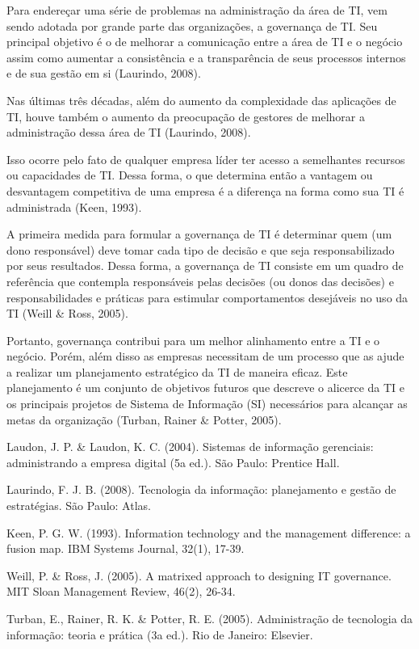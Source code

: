     Para endereçar uma série de problemas na administração da área de TI, vem sendo adotada por grande parte das organizações, a governança de TI. Seu principal objetivo é o de melhorar a comunicação entre a área de TI e o  negócio assim como aumentar a consistência e a transparência de seus processos internos e de sua gestão em si (Laurindo, 2008).

    Nas últimas três décadas, além do aumento da complexidade das aplicações de TI, houve também o aumento da preocupação de gestores de melhorar a administração dessa área de TI (Laurindo, 2008).

    Isso ocorre pelo fato de qualquer empresa líder ter acesso a semelhantes recursos ou capacidades de TI. Dessa forma, o que determina então a vantagem ou desvantagem competitiva de uma empresa é a diferença na forma como sua TI é administrada (Keen, 1993).

    A primeira medida para formular a governança de TI é determinar quem (um dono responsável) deve tomar cada tipo de decisão e que seja responsabilizado por seus resultados. Dessa forma, a governança de TI consiste em um quadro de referência que contempla responsáveis pelas decisões (ou donos das decisões) e responsabilidades e práticas para estimular comportamentos desejáveis no uso da TI (Weill \& Ross, 2005).

    Portanto, governança contribui para um melhor alinhamento entre a TI e o negócio. Porém, além disso as empresas necessitam de um processo que as ajude a realizar um planejamento estratégico da TI de maneira eficaz. Este planejamento é um conjunto de objetivos futuros que descreve o alicerce da TI e os principais projetos de Sistema de Informação (SI) necessários para alcançar as metas da organização (Turban, Rainer \& Potter, 2005).

    Laudon, J. P. \& Laudon, K. C. (2004). Sistemas de informação gerenciais: administrando a empresa digital (5a ed.). São Paulo: Prentice Hall.

    Laurindo, F. J. B. (2008). Tecnologia da informação: planejamento e gestão de estratégias. São Paulo: Atlas.

    Keen, P. G. W. (1993). Information technology and the management difference: a fusion map. IBM Systems Journal, 32(1), 17-39.

    Weill, P. \& Ross, J. (2005). A matrixed approach to designing IT governance. MIT Sloan Management Review, 46(2), 26-34.

    Turban, E., Rainer, R. K. \& Potter, R. E. (2005). Administração de tecnologia da informação: teoria e prática (3a ed.). Rio de Janeiro: Elsevier.

